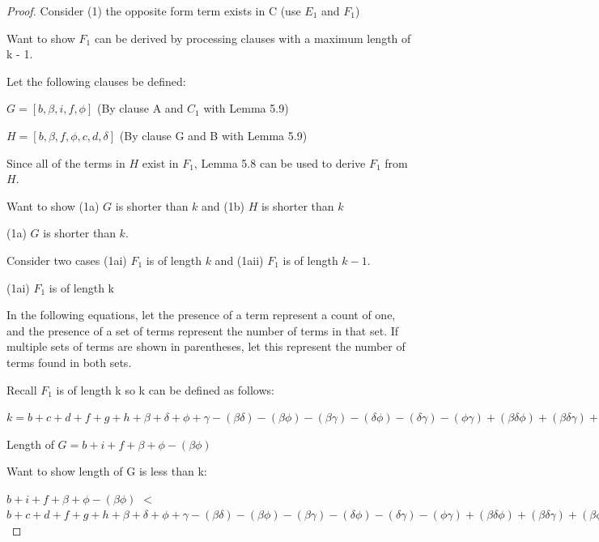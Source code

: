 \documentclass[manuscript]{acmart}
\begin{document}
\begin{proof}
        Consider (1) the opposite form term exists in C (use $E_1$ and $F_1$)

        Want to show $F_1$ can be derived by processing clauses with a maximum
        length of k - 1.

        Let the following clauses be defined:

        $G = [b, \beta, i, f, \phi]$ (By clause A and $C_1$ with Lemma 5.9)

        $H = [b, \beta, f, \phi, c, d, \delta]$ (By clause G and B with Lemma 5.9)

        Since all of the terms in $H$ exist in $F_1$, Lemma 5.8 can be used to
        derive $F_1$ from $H$.

        Want to show (1a) $G$ is shorter than $k$ and (1b) $H$ is shorter than $k$

        (1a) $G$ is shorter than $k$.

        Consider two cases (1ai) $F_1$ is of length $k$ and (1aii) $F_1$ is of length $k-1$.

        (1ai) $F_1$ is of length k

        In the following equations, let the presence of a term represent a count of one,
        and the presence of a set of terms represent the number of terms in that set. If
        multiple sets of terms are shown in parentheses, let this represent the number
        of terms found in both sets.
        
        Recall $F_1$ is of length k so k can be defined as follows:
        
        $k = b + c + d + f + g + h 
        + \beta + \delta + \phi + \gamma
        - (\beta \delta) - (\beta \phi) - (\beta \gamma) - (\delta \phi) - (\delta \gamma) - (\phi \gamma)
        + (\beta \delta \phi) + (\beta \delta \gamma) + (\beta \phi \gamma) + (\delta \phi \gamma)
        - (\beta \delta \phi \gamma)
        $

        Length of $G = b + i + f + \beta + \phi - (\beta \phi)$

        Want to show length of G is less than k:

        $b + i + f + \beta + \phi - (\beta \phi)$
        $<$
        $b + c + d + f + g + h 
        + \beta + \delta + \phi + \gamma
        - (\beta \delta) - (\beta \phi) - (\beta \gamma) - (\delta \phi) - (\delta \gamma) - (\phi \gamma)
        + (\beta \delta \phi) + (\beta \delta \gamma) + (\beta \phi \gamma) + (\delta \phi \gamma)
        - (\beta \delta \phi \gamma) 
        $


\end{proof}
\end{document}
